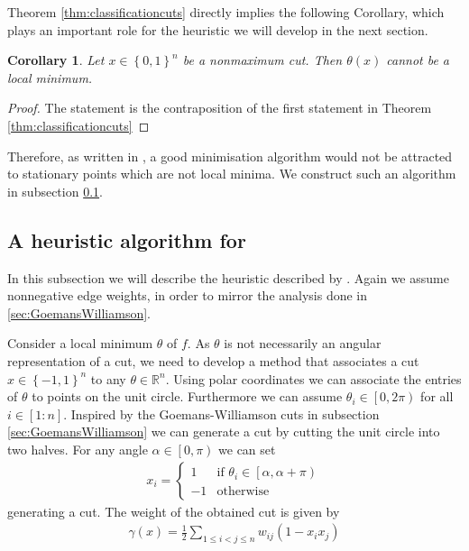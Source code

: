 \documentclass[12pt,a4paper]{article}
\theoremstyle{mythm}
\newtheorem{cor}[thm]{Corollary}
\begin{document}
Theorem \ref{thm:classificationcuts} directly implies the following Corollary, which plays an important role for the heuristic we will develop in the next section.
\begin{cor}
Let $ x \in \left\{ 0,1 \right\} ^{ n } $ be a nonmaximum cut. Then $ \theta ( x )  $ cannot be a local minimum.
\end{cor} 
\begin{proof}
The statement is the contraposition of the first statement in Theorem \ref{thm:classificationcuts} 
\end{proof}
Therefore, as written in \cite[p.509]{Burer2002}, a good minimisation algorithm would not be attracted to stationary points which are not local minima. 
We construct such an algorithm in subsection \ref{sec:BurerHeuristic}.
\newpage
\subsection{A heuristic algorithm for \MCP} 
\label{sec:BurerHeuristic} 
In this subsection we will describe the heuristic described by \cite{Burer2002}.
Again we assume nonnegative edge weights, in order to mirror the analysis done in \ref{sec:GoemansWilliamson}.

Consider a local minimum $ \theta $ of $ f $.
As $ \theta $ is not necessarily an angular representation of a cut, we need to develop a method that associates a cut $ x \in \left\{ -1,1 \right\} ^{ n }  $ to any $ \theta \in
\mathbb{R} ^{ n }  $.
Using polar coordinates we can associate the entries of $ \theta $ to points on the unit circle.
Furthermore we can assume $ \theta_i \in \left[ 0, 2\pi \right)  $ for all $ i \in \left[ 1:n \right]  $.
Inspired by the Goemans-Williamson cuts in subsection \ref{sec:GoemansWilliamson} we can generate a cut by cutting the unit circle into two halves. 
For any angle $ \alpha \in \left[ 0, \pi \right)  $ we can set
\begin{align}
\label{eq:assigncut} 
x_i = \begin{cases}
1 & \text{if } \theta_i \in \left[ \alpha , \alpha + \pi \right) \\
-1 & \text{otherwise}
\end{cases}
\end{align} 
generating a cut.
The weight of the obtained cut is given by
\begin{align*}
\gamma (x) = \frac{ 1 }{ 2 } \sum_{ 1 \leq i < j \leq n }^{  } w _{ ij } \left( 1 - x_i x_j \right) 
\end{align*} 
\end{document}
